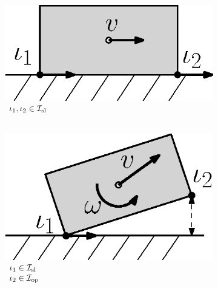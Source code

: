\documentclass[../DC2017114Bouma.tex]{subfiles}
\begin{document}
\begin{figure}[h]
\begin{subfigure}[b]{0.17\textwidth}
\end{subfigure}
\quad
\begin{subfigure}[b]{0.17\textwidth}   
\centering 
\includegraphics[width=\textwidth]{example3.eps}
\caption{$\begin{array}{l}
\iota_1,\iota_2\in\mathcal{I}_{\textnormal{sl}}\\ \hspace{0cm}
\end{array}$}
\label{fig:2example3}
\end{subfigure}
\quad
\begin{subfigure}[b]{0.17\textwidth}  
\centering 
\includegraphics[width=\textwidth]{example4.eps}
\caption{$\begin{array}{l}
\iota_1\in\mathcal{I}_{\textnormal{sl}}\\\iota_2\in\mathcal{I}_{\textnormal{op}}
\end{array}$}
\label{fig:2example4}
\end{subfigure}
\quad
\begin{subfigure}[b]{0.17\textwidth}   
\centering 

\end{subfigure}
\end{figure}
\end{document}

